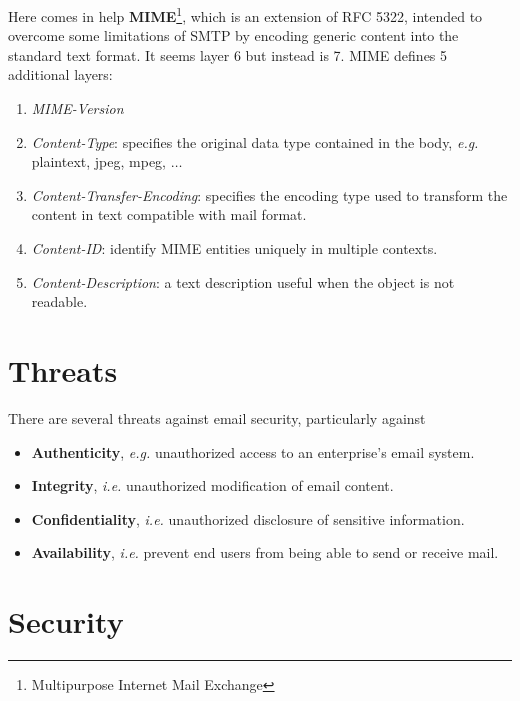 \documentclass[oneside]{academica}
\begin{document}
Here comes in help \textbf{MIME}\footnote{Multipurpose Internet Mail Exchange}, which is an extension of RFC 5322, intended to overcome some limitations of SMTP by encoding generic content into the standard text format.
It seems layer 6 but instead is 7.
MIME defines 5 additional layers:
\begin{enumerate}
  \item \textit{MIME-Version}
  \item \textit{Content-Type}: specifies the original data type contained in the body, \textit{e.g.} plaintext, jpeg, mpeg, $\ldots$
  \item \textit{Content-Transfer-Encoding}: specifies the encoding type used to transform the content in text compatible with mail format.
  \item \textit{Content-ID}: identify MIME entities uniquely in multiple contexts.
  \item \textit{Content-Description}: a text description useful when the object is not readable.
\end{enumerate}

\newpage

\section{Threats}

There are several threats against email security, particularly against
\begin{itemize}
  \item \textbf{Authenticity}, \textit{e.g.} unauthorized access to an enterprise's email system.
  \item \textbf{Integrity}, \textit{i.e.} unauthorized modification of email content.
  \item \textbf{Confidentiality}, \textit{i.e.} unauthorized disclosure of sensitive information.
  \item \textbf{Availability}, \textit{i.e.} prevent end users from being able to send or receive mail.
\end{itemize}

\section{Security}
\end{document}
